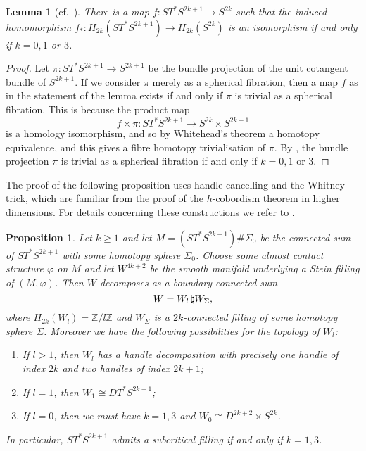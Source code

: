 \documentclass[12pt]{amsart}
\newcommand\Z{\mathbb{Z}}
\newcommand\acs{\varphi}  				%
\newtheorem{Lemma}[Theorem]{Lemma}
\newtheorem{Proposition}[Theorem]{Proposition}
\theoremstyle{remark}
\newcommand{\ascomm}[1]{\begingroup\color{red}AS:~#1\endgroup}
\begin{document}
\begin{Lemma}[cf.~{\cite[Theorem 2]{Milnor&Spanier}}] \label{lem:cotangent}
There is a map $f \colon ST^*S^{2k{+}1} \to S^{2k}$ such that the induced homomorphism
$f_* \colon H_{2k}(ST^*S^{2k{+}1}) \to H_{2k}(S^{2k})$ is an isomorphism if and only if $k = 0, 1$ or $ 3$.
\end{Lemma} 

\begin{proof}
Let $\pi \colon ST^*S^{2k{+}1} \to S^{2k{+}1}$ be the bundle projection
of the unit cotangent bundle of $S^{2k{+}1}$. 
If we consider $\pi$ merely as a spherical fibration,
then a map $f$ as in the statement of the lemma exists if and only if $\pi$ is trivial as
a spherical fibration.  This is because the product map
%
\[ f \times \pi \colon ST^*S^{2k{+}1} \to S^{2k} \times S^{2k{+}1} \]
%
is a homology isomorphism, and so by Whitehead's theorem a homotopy
equivalence, and this gives a fibre homotopy trivialisation of $\pi$.
By \cite[Theorem~2]{Milnor&Spanier}, the bundle projection $\pi$ is
trivial as a spherical fibration if and only if $k = 0, 1$ or $3$.
\end{proof}

The proof of the following proposition uses handle cancelling and the
Whitney trick, which are familiar from the proof of the $h$-cobordism
theorem in higher dimensions. For details concerning these
constructions we refer to \cite{Milnor65, Whitney44}.
\begin{Proposition}\label{prop:filling_cotangent_spheres}
Let $k \geq 1$ and let $M = (ST^*S^{2k{+}1}) \# \Sigma _0$ be the
connected sum of $ST^*S^{2k{+}1}$ with some homotopy sphere $\Sigma
_0$. Choose some almost contact structure $\varphi$ on $M$ and let
$W^{4k+2}$ be the smooth manifold underlying a Stein filling of $(M,
\acs)$.  Then $W$ decomposes as a boundary connected sum
%
\[ W =W_l\thinspace \natural W_\Sigma,\]
%
where $H_{2k}(W_l) = \Z /l\Z$ and $W_\Sigma$ is a $2k$-connected filling of some homotopy
sphere $\Sigma$. 
Moreover we have the following possibilities for the topology of $W_l$:
\begin{enumerate}

\item If $l > 1$, then $W_l$ has a handle decomposition with precisely
  one handle of index $2k$ and two handles of index $2k{+}1$;

\item If $l = 1$, then $W_1 \cong DT^*S^{2k{+}1}$;

\item If $l = 0$, then we must have $k = 1, 3$ and $W_0 \cong D^{2k{+}2} \times S^{2k}$.

\end{enumerate}
In particular, $ST^*S^{2k{+}1}$ admits a subcritical filling if and only if $k = 1,3$.
\end{Proposition}
\end{document}

